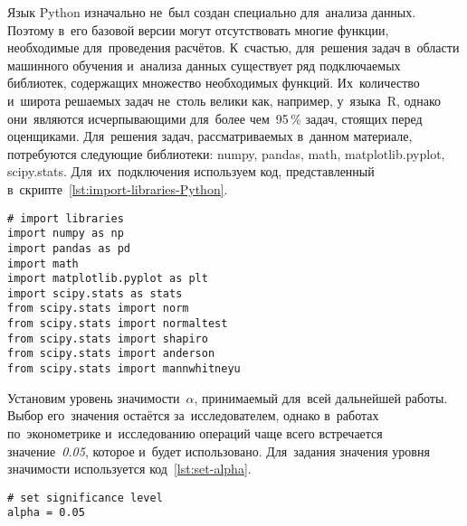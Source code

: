 \documentclass[]{scrartcl}
\begin{document}
Язык \foreignlanguage{english}{Python} изначально не~был создан специально для~анализа данных. Поэтому в~его базовой версии могут отсутствовать многие функции, необходимые для~проведения расчётов. К~счастью, для~решения задач в~области машинного обучения и~анализа данных существует ряд подключаемых библиотек, содержащих множество необходимых функций. Их~количество и~широта решаемых задач не~столь велики как, например, у~языка~R, однако они~являются исчерпывающими для~более чем~95\,\% задач, стоящих перед оценщиками. Для~решения задач, рассматриваемых в~данном материале, потребуются следующие библиотеки: \foreignlanguage{english}{numpy, pandas, math, matplotlib.pyplot, scipy.stats}. Для~их~подключения используем код, представленный в~скрипте~\ref{lst:import-libraries-Python}.
\begin{lstlisting}[float, caption = Подключение необходимых библиотек, firstnumber=1, label= lst:import-libraries-Python]
# import libraries
import numpy as np
import pandas as pd
import math
import matplotlib.pyplot as plt
import scipy.stats as stats
from scipy.stats import norm
from scipy.stats import normaltest
from scipy.stats import shapiro
from scipy.stats import anderson
from scipy.stats import mannwhitneyu
\end{lstlisting}
%

Установим уровень значимости~${\textstyle \alpha}$, принимаемый для~всей дальнейшей работы. Выбор его~значения остаётся за~исследователем, однако в~работах по~эконометрике и~исследованию операций чаще всего встречается значение~\textit{0.05}, которое и~будет использовано. Для~задания значения уровня значимости используется код~\ref{lst:set-alpha}.
%
\begin{lstlisting}[float, caption = Задание применяемого уровня значимости, firstnumber=1, label= lst:set-alpha]
# set significance level
alpha = 0.05
\end{lstlisting}
% 
\end{document}
